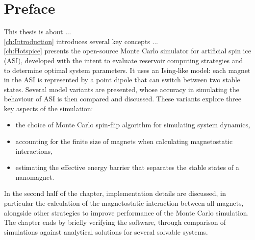 \chapter*{Preface}

This thesis is about ... \\

\cref{ch:Introduction} introduces several key concepts ... \\

\cref{ch:Hotspice} presents the open-source \hotspice Monte Carlo simulator for artificial spin ice (ASI), developed with the intent to evaluate reservoir computing strategies and to determine optimal system parameters.
It uses an Ising-like model: each magnet in the ASI is represented by a point dipole that can switch between two stable states.
Several model variants are presented, whose accuracy in simulating the behaviour of ASI is then compared and discussed.
These variants explore three key aspects of the simulation:
\begin{itemize}[noitemsep,nolistsep] %
	\item the choice of Monte Carlo spin-flip algorithm for simulating system dynamics,
	\item accounting for the finite size of magnets when calculating magnetostatic interactions,
	\item estimating the effective energy barrier that separates the stable states of a nanomagnet.
\end{itemize}
In the second half of the chapter, implementation details are discussed, in particular the calculation of the magnetostatic interaction between all magnets, alongside other strategies to improve performance of the Monte Carlo simulation.
The chapter ends by briefly verifying the software, through comparison of simulations against analytical solutions for several solvable systems. \\

